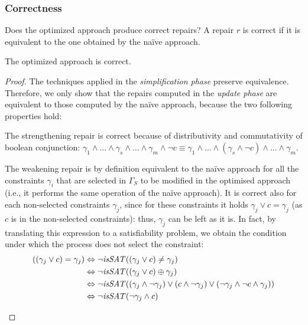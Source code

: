 \begin{tikzborder}{\cite{Gargantini16:validation}}
\begin{tikzborder}{\cite{gargantini_combinatorial_2017}}
\begin{tikzborder}{\cite{gargantini_combinatorial_2017}}
\begin{tikzborder}{\cite{garn2019}}
\begin{tikzborder}{\cite{arcaini2019achieving}}
\begin{tikzborder}{\cite{arcaini2019varivolution}}
		\subsubsection{Correctness}
		
		\bb Does the optimized approach produce correct repairs? A repair $r$ is correct if it is equivalent to the one obtained by the na{\"i}ve approach.
		
		\begin{thm}\label{thm:correctnessOptmised}
			The optimized approach is correct.
		\end{thm}
		
		\begin{proof}
			The techniques applied in the \emph{simplification phase} preserve equivalence. Therefore, we only show that the repairs computed in the \emph{update phase} are equivalent to those computed by the na{\"i}ve approach, because the two following properties hold:
			\begin{compactitem}
				\item The strengthening repair is correct because of distributivity and commutativity of boolean conjunction: $\gamma_1 \wedge \ldots \wedge \gamma_s \wedge \ldots \wedge \gamma_m \wedge \neg c \equiv \gamma_1 \wedge \ldots \wedge (\gamma_s \wedge \neg c) \wedge \ldots \wedge \gamma_m$.
				\item The weakening repair is by definition equivalent to the na{\"i}ve approach for all the constraints $\gamma_i$ that are selected in $\Gamma_S$ to be modified in the optimised approach (i.e., it performs the same operation of the na{\"i}ve approach). It is correct also for each non-selected constraints $\gamma_j$, since for these constraints it holds $\gamma_j \vee c = \gamma_j$ (as $c$ is \false in the non-selected constraints): thus, $\gamma_j$ can be left as it is. In fact, by translating this expression to a satisfiability problem, we obtain the condition under which the process does not select the constraint:
				\begin{align*}
				((\gamma_j \vee c) = \gamma_j) &\Leftrightarrow \neg \mathit{isSAT}((\gamma_j \vee c) \neq \gamma_j) \\
				& \Leftrightarrow \neg \mathit{isSAT}( (\gamma_j \vee c) \oplus \gamma_j) \\
				& \Leftrightarrow \neg \mathit{isSAT}( (\gamma_j \wedge \neg \gamma_j) \vee (c \wedge \neg \gamma_j) \vee (\neg \gamma_j \wedge \neg c \wedge \gamma_j) ) \\
				& \Leftrightarrow \neg \mathit{isSAT}(\neg \gamma_j \wedge c) \\
				\end{align*}
			\end{compactitem}
		\end{proof}\be
		

\end{tikzborder}
\end{tikzborder}
\end{tikzborder}
\end{tikzborder}
\end{tikzborder}
\end{tikzborder}
